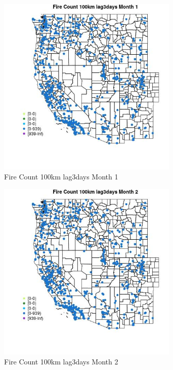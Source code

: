 \begin{figure} 
\centering  
\includegraphics[width=0.77\textwidth]{Code_Outputs/Report_ML_input_PM25_Step4_part_e_de_duplicated_aves_compiled_2019-05-21wNAs_MapObsMo1Fire_Count_100km_lag3days.jpg} 
\caption{\label{fig:Report_ML_input_PM25_Step4_part_e_de_duplicated_aves_compiled_2019-05-21wNAsMapObsMo1Fire_Count_100km_lag3days}Fire Count 100km lag3days Month 1} 
\end{figure} 
 

\begin{figure} 
\centering  
\includegraphics[width=0.77\textwidth]{Code_Outputs/Report_ML_input_PM25_Step4_part_e_de_duplicated_aves_compiled_2019-05-21wNAs_MapObsMo2Fire_Count_100km_lag3days.jpg} 
\caption{\label{fig:Report_ML_input_PM25_Step4_part_e_de_duplicated_aves_compiled_2019-05-21wNAsMapObsMo2Fire_Count_100km_lag3days}Fire Count 100km lag3days Month 2} 
\end{figure} 
 

